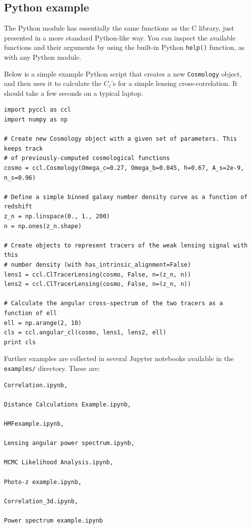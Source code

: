 \documentclass[\docopts]{\docclass}
\begin{document}
\subsection{Python example}
\label{sec:python:example}

The Python module has essentially the same functions as the C library, just presented in a more standard Python-like way. You can inspect the available functions and their arguments by using the built-in Python {\tt help()} function, as with any Python module.

Below is a simple example Python script that creates a new {\tt Cosmology} object, and then uses it to calculate the $C_\ell$'s for a simple lensing cross-correlation. It should take a few seconds on a typical laptop.
\begin{verbatim}
import pyccl as ccl
import numpy as np

# Create new Cosmology object with a given set of parameters. This keeps track
# of previously-computed cosmological functions
cosmo = ccl.Cosmology(Omega_c=0.27, Omega_b=0.045, h=0.67, A_s=2e-9, n_s=0.96)

# Define a simple binned galaxy number density curve as a function of redshift
z_n = np.linspace(0., 1., 200)
n = np.ones(z_n.shape)

# Create objects to represent tracers of the weak lensing signal with this
# number density (with has_intrinsic_alignment=False)
lens1 = ccl.ClTracerLensing(cosmo, False, n=(z_n, n))
lens2 = ccl.ClTracerLensing(cosmo, False, n=(z_n, n))

# Calculate the angular cross-spectrum of the two tracers as a function of ell
ell = np.arange(2, 10)
cls = ccl.angular_cl(cosmo, lens1, lens2, ell)
print cls
\end{verbatim}

Further examples are collected in several Jupyter notebooks available in the {\tt examples/} directory. These are:
\begin{verbatim}
Correlation.ipynb,

Distance Calculations Example.ipynb,

HMFexample.ipynb,

Lensing angular power spectrum.ipynb,

MCMC Likelihood Analysis.ipynb,

Photo-z example.ipynb,

Correlation_3d.ipynb,

Power spectrum example.ipynb
\end{verbatim}
\end{document}
